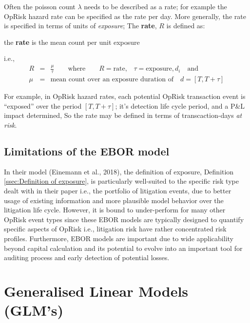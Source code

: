 \documentclass{DissertateUSU}
\begin{document}
Often the poisson count \(\lambda\) needs to be described as a rate; for
example the OpRisk hazard rate can be specified as the rate per day.
More generally, the rate is specified in terms of units of
\emph{exposure}; The \textbf{rate}, \(R\) is defined as:\medskip

\begin{definition}
the \textbf{rate} is the mean count per unit exposure
\end{definition}

i.e., \singlespacing \begin{eqnarray}
R &=& \frac{\mu}{\tau} \qquad \mbox{where} \qquad R = \mbox{rate,} \quad \tau = \mbox{exposure},d_{i}\quad \mbox{and}\nonumber\\
\mu &=& \mbox{mean count over an exposure duration of} \quad d = [T,T+\tau] \nonumber
\end{eqnarray} \doublespacing

For example, in OpRisk hazard rates, each potential OpRisk transaction
event is ``exposed'' over the period \([T,T+\tau]\); it's detection life
cycle period, and a P\&L impact determined, So the rate may be defined
in terms of transcaction-days \emph{at risk}.

\subsection{Limitations of the EBOR model}

In their model (Einemann et al., 2018), the definition of exposure,
Definition \ref{ssec:Definition of exposure}, is particularly
well-suited to the specific risk type dealt with in their paper i.e.,
the portfolio of litigation events, due to better usage of existing
information and more plausible model behavior over the litigation life
cycle. However, it is bound to under-perform for many other OpRisk event
types since these EBOR models are typically designed to quantify
specific aspects of OpRisk i.e., litigation risk have rather
concentrated risk profiles. Furthermore, EBOR models are important due
to wide applicability beyond capital calculation and its potential to
evolve into an important tool for auditing process and early detection
of potential losses.

\section{Generalised Linear Models (GLM's)}
\label{sec:Generalised Linear Models}
\end{document}
